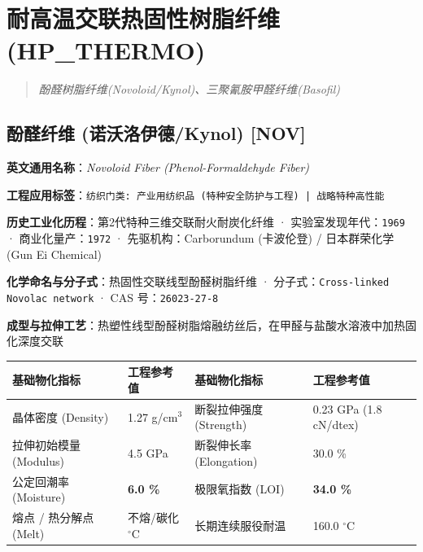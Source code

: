 \documentclass[11pt,openright,twoside,UTF8]{ctexbook}
\begin{document}
\chapter{耐高温交联热固性树脂纤维 (HP\_THERMO)}
\begin{quote}
\small\itshape
酚醛树脂纤维(Novoloid/Kynol)、三聚氰胺甲醛纤维(Basofil)
\end{quote}

\section{酚醛纤维 (诺沃洛伊德/Kynol) [NOV]}
\label{sec:nov}

\noindent\textbf{英文通用名称}：\textit{Novoloid Fiber (Phenol-Formaldehyde Fiber)}\par
\noindent\textbf{工程应用标签}：\texttt{纺织门类: 产业用纺织品 (特种安全防护与工程) | 战略特种高性能}\par
\noindent\textbf{历史工业化历程}：第2代特种三维交联耐火耐炭化纤维 · 实验室发现年代：\texttt{1969} · 商业化量产：\texttt{1972} · 先驱机构：Carborundum (卡波伦登) / 日本群荣化学 (Gun Ei Chemical)\par
\noindent\textbf{化学命名与分子式}：热固性交联线型酚醛树脂纤维 · 分子式：\texttt{Cross-linked Novolac network} · CAS 号：\texttt{26023-27-8}\par
\noindent\textbf{成型与拉伸工艺}：热塑性线型酚醛树脂熔融纺丝后，在甲醛与盐酸水溶液中加热固化深度交联\par

\vspace{0.15cm}
\begin{center}
\small
\begin{tabularx}{\textwidth}{p{3.8cm}Xp{3.8cm}X}
\toprule
\textbf{基础物化指标} & \textbf{工程参考值} & \textbf{基础物化指标} & \textbf{工程参考值} \\
\midrule
晶体密度 (Density) & 1.27 g/cm$^3$ & 断裂拉伸强度 (Strength) & 0.23 GPa (1.8 cN/dtex) \\
拉伸初始模量 (Modulus) & 4.5 GPa & 断裂伸长率 (Elongation) & 30.0 \% \\
公定回潮率 (Moisture) & \textbf{6.0 \%} & 极限氧指数 (LOI) & \textbf{34.0 \%} \\
熔点 / 热分解点 (Melt) & 不熔/碳化 $^\circ\mathrm{C}$ & 长期连续服役耐温 & 160.0 $^\circ\mathrm{C}$ \\
\bottomrule
\end{tabularx}
\end{center}
\vspace{0.15cm}
\end{document}
